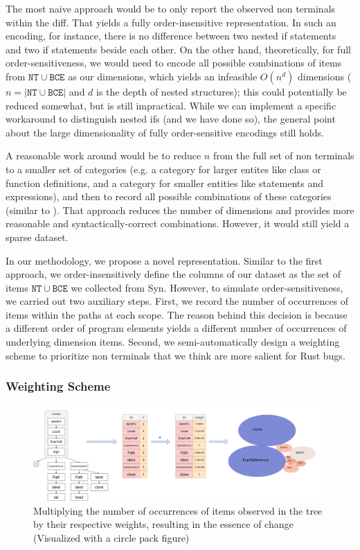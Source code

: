 The most naive approach would be to only report the observed non terminals within the diff. That yields a fully order-insensitive representation. In such an encoding, for instance, there is no difference between two nested if statements and two if statements beside each other. On the other hand, theoretically, for full order-sensitiveness, we would need to encode all possible combinations of items from $\mathtt{NT} \cup \mathtt{BCE}$ as our dimensions, which yields an infeasible $O(n^d)$ dimensions ($n=|\mathtt{NT} \cup \mathtt{BCE}|$ and $d$ is the depth of nested structures); this could potentially be reduced somewhat, but is still impractical. While we can implement a specific workaround to distinguish nested ifs (and we have done so), the general point about the large dimensionality of fully order-sensitive encodings still holds.

A reasonable work around would be to reduce $n$ from the full set of non terminals to a smaller set of categories (e.g. a category for larger entites like class or function definitions, and a category for smaller entities like statements and expressions), and then to record all possible combinations of these categories (similar to \cite{hanam2016discovering}). That approach reduces the number of dimensions and provides more reasonable and syntactically-correct combinations. However, it would still yield a sparse dataset. 

In our methodology, we propose a novel representation. Similar to the first approach, we order-insensitively define the columns of our dataset as the set of items $\mathtt{NT} \cup \mathtt{BCE}$ we collected from Syn. However, to simulate order-sensitiveness, we carried out two auxiliary steps. First, we record the number of occurrences of items within the paths at each scope. The reason behind this decision is because a different order of program elements yields a different number of occurrences of underlying dimension items. Second, we semi-automatically design a weighting scheme to prioritize non terminals that we think are more salient for Rust bugs.

\subsubsection{\label{sec:weighting_scheme}Weighting Scheme}

\begin{figure}[h]
    \centering
    \includegraphics[width=1\textwidth]{figs/essence.png}
    \caption{\label{fig:essence}Multiplying the number of occurrences of items observed in the tree by their respective weights, resulting in the essence of change (Visualized with a circle pack figure)}
\end{figure}


